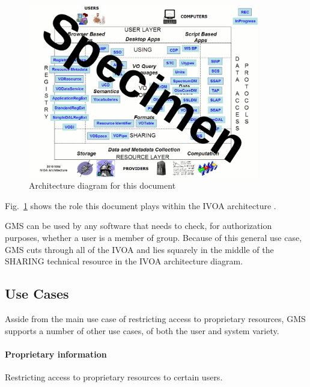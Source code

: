 \documentclass[11pt,a4paper]{ivoa}
\begin{document}
\begin{figure}
\centering


\includegraphics[width=0.9\textwidth]{archdiag.png}
\caption{Architecture diagram for this document}
\label{fig:archdiag}
\end{figure}

Fig.~\ref{fig:archdiag} shows the role this document plays within the
IVOA architecture \citep{note:VOARCH}.

GMS can be used by any software that needs to check, for authorization purposes, whether a user is a member of group.  Because of this general use case, GMS cuts through all of the IVOA and lies squarely in the middle of the SHARING technical resource in the IVOA architecture diagram.

\subsection{Use Cases}

Asside from the main use case of restricting access to proprietary resources, GMS supports a number of other use cases, of both the user and system variety.

\paragraph{Proprietary information} Restricting access to proprietary resources to certain users.
\end{document}
